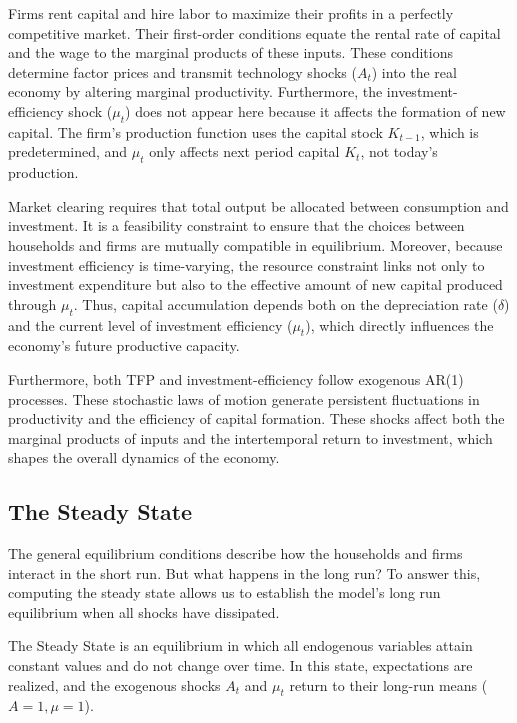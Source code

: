 \documentclass[12pt]{article}
\begin{document}
Firms rent capital and hire labor to maximize their profits in a perfectly competitive market. Their first-order conditions equate the rental rate of capital and the wage to the marginal products of these inputs. These conditions determine factor prices and transmit technology shocks ($A_t$) into the real economy by altering marginal productivity.
Furthermore, the investment-efficiency shock ($\mu_t$) does not appear here because it affects the formation of new capital. The firm’s production function uses the capital stock $K_{t-1}$, which  is predetermined, and $\mu_t$ only affects next period capital $K_t$, not today's production.

Market clearing requires that total output be allocated between consumption and investment. It is a feasibility constraint to ensure that the choices between households and firms are mutually compatible in equilibrium. Moreover, because investment efficiency is time-varying, the resource constraint links not only to investment expenditure but also to the effective amount of new capital produced through $\mu_t$. Thus, capital accumulation depends both on the depreciation rate ($\delta$) and the current level of investment efficiency ($\mu_t$), which directly influences the economy’s future productive capacity.

Furthermore, both TFP and investment-efficiency follow exogenous AR(1) processes. These stochastic laws of motion generate persistent fluctuations in productivity and the efficiency of capital formation. These shocks affect both the marginal products of inputs and the intertemporal return to investment, which shapes the overall dynamics of the economy.
\subsection{The Steady State}
The general equilibrium conditions describe how the households and firms interact in the short run. But what happens in the long run? To answer this, computing the steady state allows us to establish the model’s long run equilibrium when all shocks have dissipated.

The Steady State is an equilibrium in which all endogenous variables attain constant values and do not change over time. In this state, expectations are realized, and the exogenous shocks $A_t$ and $\mu_t$ return to their long-run means ($A=1, \mu=1$).
\end{document}

